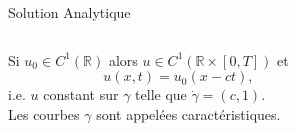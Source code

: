\documentclass[aspectratio=169, french]{beamer}
\newcommand{\bbR}{\mathbb{R}}
\begin{document}
\begin{frame}{Solution Analytique}
	\begin{columns}
	\begin{column}{.58\textwidth}
		\begin{overlayarea}{\textwidth}{\textheight}
		\vspace{1cm}
		\begin{tcolorbox}[title = Solution analytique regulière, coltitle=white]
			Si $u_0 \in C^{1}(\bbR)$ alors  
			$u \in C^{1}(\bbR \times[0, T])$ et
			\begin{equation*}
				u(x, t) = 	u_0(x - ct),
			\end{equation*}
		i.e. $u$ constant sur $\gamma$ telle que $\dot{\gamma} = (c ,1)$. \\
		Les courbes $\gamma$ sont appelées caractéristiques.
		\end{tcolorbox}
		\end{overlayarea}
	\end{column}
	\begin{column}{.42\textwidth}
		\begin{overlayarea}{\textwidth}{\textheight}
		\begin{figure}[t]
\end{figure}
\end{overlayarea}
\end{column}
\end{columns}
\end{frame}
\end{document}
